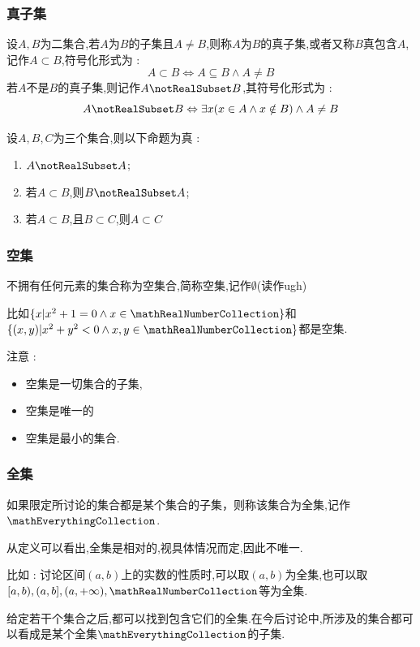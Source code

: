 {{\subsubsection{真子集}{
  设$A,B$为二集合,若$A$为$B$的子集且$A \neq B$,则称$A$为$B$的真子集,或者又称$B$真包含$A$,记作$A \subset B$,符号化形式为 : $$
    A \subset B \Leftrightarrow A \subseteq B \land A \neq B
  $$
  若$A$不是$B$的真子集,则记作$A \notRealSubset B$,其符号化形式为 : $$
    A \notRealSubset B \Leftrightarrow \exists x (x \in A \land x \notin B) \land A \neq B
  $$

  设$A,B,C$为三个集合,则以下命题为真 :

  \begin{enumerate}
    \item $A \notRealSubset A$;
    \item 若$A \subset B$,则$B \notRealSubset A$;
    \item 若$A \subset B$,且$B \subset C$,则$A \subset C$
  \end{enumerate}
}%

\subsubsection{空集}{
  不拥有任何元素的集合称为空集合,简称空集,记作$\emptyset$(读作ugh)

  比如$\{x | x^2 + 1 = 0 \land x \in \mathRealNumberCollection\}$和$\{(x,y) | x^2+y^2 < 0 \land x,y \in \mathRealNumberCollection\}$都是空集.

  注意 :

  \begin{itemize}
    \item 空集是一切集合的子集,
    \item 空集是唯一的
    \item 空集是最小的集合.
  \end{itemize}
}%

\subsubsection{全集}{
  如果限定所讨论的集合都是某个集合的子集，则称该集合为全集,记作$\mathEverythingCollection$.

  从定义可以看出,全集是相对的,视具体情况而定,因此不唯一.

  比如 : 讨论区间$(a,b)$上的实数的性质时,可以取$(a,b)$为全集,也可以取$[a,b),(a,b],(a , +\infty),\mathRealNumberCollection$等为全集.

  给定若干个集合之后,都可以找到包含它们的全集.在今后讨论中,所涉及的集合都可以看成是某个全集$\mathEverythingCollection$的子集.
}%

}}
